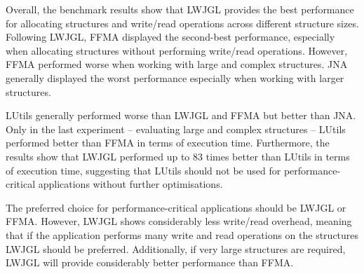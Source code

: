 Overall, the benchmark results show that LWJGL provides the best performance for allocating structures and write/read
operations across different structure sizes.
Following LWJGL, FFMA displayed the second-best performance, especially when allocating structures without
performing write/read operations.
However, FFMA performed worse when working with large and complex structures.
JNA generally displayed the worst performance especially when working with larger structures.

LUtils generally performed worse than LWJGL and FFMA but better than JNA. Only in the last experiment – evaluating large
and complex structures – LUtils performed better than FFMA in terms of execution time.
Furthermore, the results show that LWJGL performed up to 83 times better than LUtils in terms of execution time,
suggesting that LUtils should not be used for performance-critical applications without further optimisations.

The preferred choice for performance-critical applications should be LWJGL or FFMA\@.
However, LWJGL shows considerably less write/read overhead, meaning that if the application performs many write and read
operations on the structures LWJGL should be preferred.
Additionally, if very large structures are required, LWJGL will provide considerably better performance than FFMA\@.








